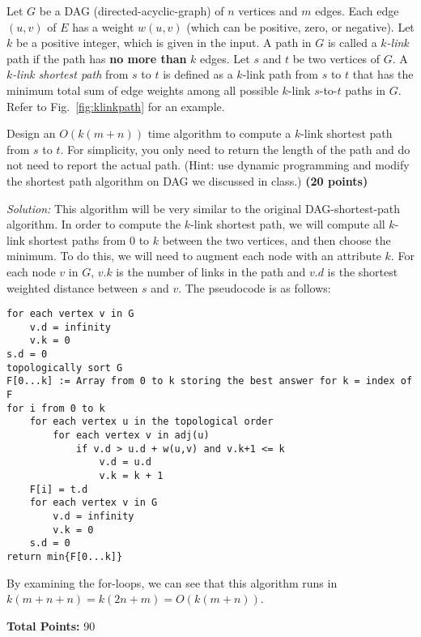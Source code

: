\documentclass[11pt]{article}
\begin{document}
\begin{enumerate}
Let $G$ be a DAG (directed-acyclic-graph) of $n$ vertices and $m$ edges. Each edge $(u,v)$ of $E$ has a weight $w(u,v)$ (which can be positive, zero, or negative). Let $k$ be a positive integer, which is given in the input. A path in $G$ is called a {\em $k$-link} path if the path has {\bf no more than} $k$ edges. Let $s$ and $t$ be two vertices of $G$. A {\em $k$-link shortest path} from $s$ to $t$ is defined as a $k$-link path from $s$ to $t$ that has the minimum total sum of edge weights among all possible $k$-link $s$-to-$t$ paths in $G$. Refer to Fig.~\ref{fig:klinkpath} for an example.

Design an $O(k(m+n))$ time algorithm to compute a $k$-link shortest path from $s$ to $t$. For simplicity, you only need to return the length of the path and do not need to report the actual path. (Hint: use dynamic programming and modify the shortest path algorithm on DAG we discussed in class.)
{\hfill \bf (20 points)}

\textit{Solution:} This algorithm will be very similar to the original DAG-shortest-path algorithm. In order to compute the $k$-link shortest path, we will compute all $k$-link shortest paths from 0 to $k$ between the two vertices, and then choose the minimum. To do this, we will need to augment each node with an attribute $k$. For each node $v$ in $G$, $v.k$ is the number of links in the path and $v.d$ is the shortest weighted distance between $s$ and $v$. The pseudocode is as follows:
\begin{verbatim}
for each vertex v in G
    v.d = infinity
    v.k = 0
s.d = 0
topologically sort G
F[0...k] := Array from 0 to k storing the best answer for k = index of F
for i from 0 to k
    for each vertex u in the topological order
        for each vertex v in adj(u)
            if v.d > u.d + w(u,v) and v.k+1 <= k
                v.d = u.d
                v.k = k + 1
    F[i] = t.d
    for each vertex v in G
        v.d = infinity
        v.k = 0
    s.d = 0
return min{F[0...k]}
\end{verbatim}
By examining the for-loops, we can see that this algorithm runs in $k(m+n+n)=k(2n+m)=O(k(m+n))$.


\end{enumerate}


{\bf Total Points:} 90
\end{document}
